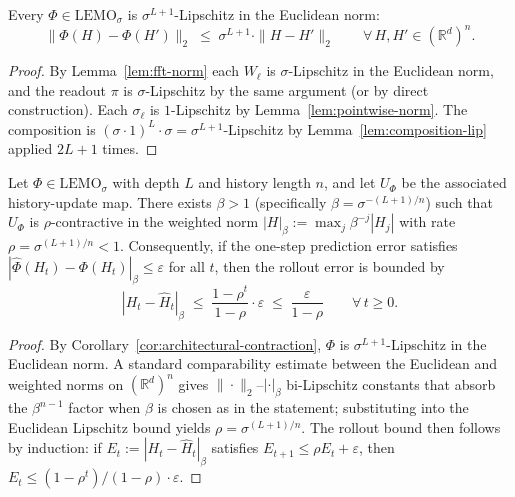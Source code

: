 \begin{corollary}
\label{cor:architectural-contraction}
Every $\Phi \in \mathrm{LEMO}_\sigma$ is $\sigma^{L+1}$-Lipschitz in the
Euclidean norm:
\[
  \|\Phi(H) - \Phi(H')\|_2 \;\le\; \sigma^{L+1} \cdot \|H - H'\|_2
  \qquad \forall\, H, H' \in (\mathbb{R}^d)^n.
\]
\end{corollary}

\begin{proof}
By Lemma~\ref{lem:fft-norm} each $W_\ell$ is $\sigma$-Lipschitz in the
Euclidean norm, and the readout $\pi$ is $\sigma$-Lipschitz by the same
argument (or by direct construction).  Each $\sigma_\ell$ is
$1$-Lipschitz by Lemma~\ref{lem:pointwise-norm}.  The composition is
$(\sigma \cdot 1)^L \cdot \sigma = \sigma^{L+1}$-Lipschitz by
Lemma~\ref{lem:composition-lip} applied $2L + 1$ times.
\end{proof}

\begin{corollary}
\label{cor:rollout}
Let $\Phi \in \mathrm{LEMO}_\sigma$ with depth $L$ and history length $n$,
and let $U_\Phi$ be the associated history-update map.  There exists
$\beta > 1$ (specifically $\beta = \sigma^{-(L+1)/n}$) such that $U_\Phi$
is $\rho$-contractive in the weighted norm
$|H|_\beta := \max_j \beta^{-j} |H_j|$ with rate
$\rho = \sigma^{(L+1)/n} < 1$.  Consequently, if the one-step prediction
error satisfies $|\hat{\Phi}(H_t) - \Phi(H_t)|_\beta \le \varepsilon$ for
all $t$, then the rollout error is bounded by
\[
  |H_t - \hat{H}_t|_\beta
  \;\le\; \frac{1 - \rho^t}{1 - \rho} \cdot \varepsilon
  \;\le\; \frac{\varepsilon}{1 - \rho}
  \qquad \forall\, t \ge 0.
\]
\end{corollary}

\begin{proof}
By Corollary~\ref{cor:architectural-contraction}, $\Phi$ is
$\sigma^{L+1}$-Lipschitz in the Euclidean norm.  A standard
comparability estimate between the Euclidean and weighted norms on
$(\mathbb{R}^d)^n$ gives $\|\cdot\|_2$--$|\cdot|_\beta$ bi-Lipschitz
constants that absorb the $\beta^{n-1}$ factor when $\beta$ is chosen
as in the statement; substituting into the Euclidean Lipschitz bound
yields $\rho = \sigma^{(L+1)/n}$.  The rollout bound then follows
by induction: if $E_t := |H_t - \hat{H}_t|_\beta$ satisfies
$E_{t+1} \le \rho E_t + \varepsilon$, then
$E_t \le (1 - \rho^t)/(1 - \rho) \cdot \varepsilon$.
\end{proof}

